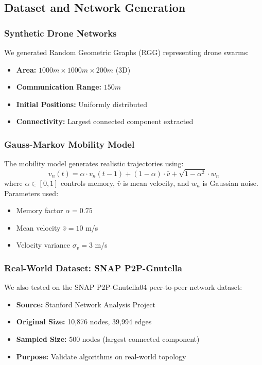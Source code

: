 \documentclass[conference]{IEEEtran}
\begin{document}
\subsection{Dataset and Network Generation}

\subsubsection{Synthetic Drone Networks}
We generated Random Geometric Graphs (RGG) representing drone swarms:
\begin{itemize}
    \item \textbf{Area:} $1000m \times 1000m \times 200m$ (3D)
    \item \textbf{Communication Range:} $150m$
    \item \textbf{Initial Positions:} Uniformly distributed
    \item \textbf{Connectivity:} Largest connected component extracted
\end{itemize}

\subsubsection{Gauss-Markov Mobility Model}
The mobility model generates realistic trajectories using:
\begin{equation}
v_n(t) = \alpha \cdot v_n(t-1) + (1-\alpha) \cdot \bar{v} + \sqrt{1-\alpha^2} \cdot w_n
\end{equation}
where $\alpha \in [0,1]$ controls memory, $\bar{v}$ is mean velocity, and $w_n$ is Gaussian noise. Parameters used:
\begin{itemize}
    \item Memory factor $\alpha = 0.75$
    \item Mean velocity $\bar{v} = 10$ m/s
    \item Velocity variance $\sigma_v = 3$ m/s
\end{itemize}

\subsubsection{Real-World Dataset: SNAP P2P-Gnutella}
We also tested on the SNAP P2P-Gnutella04 peer-to-peer network dataset:
\begin{itemize}
    \item \textbf{Source:} Stanford Network Analysis Project
    \item \textbf{Original Size:} 10,876 nodes, 39,994 edges
    \item \textbf{Sampled Size:} 500 nodes (largest connected component)
    \item \textbf{Purpose:} Validate algorithms on real-world topology
\end{itemize}
\end{document}
